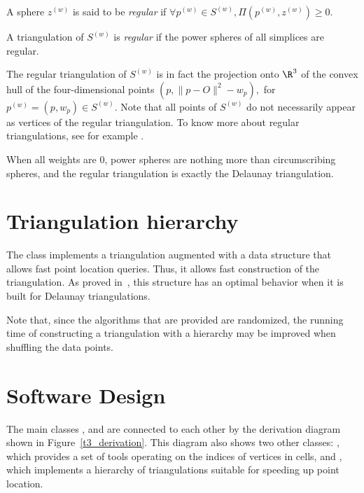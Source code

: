 A sphere ${z}^{(w)}$ is said to be
\textit{regular} if $\forall {p}^{(w)}\in{S}^{(w)},
\Pi{({p}^{(w)},{z}^{(w)})}\geq 0$.

A triangulation of ${S}^{(w)}$ is \textit{regular} if the power spheres
of all simplices are regular. 

The regular triangulation of
${S}^{(w)}$ is in fact the projection onto $\R^3$ of the convex hull 
of the four-dimensional points $(p,\|p-O\|^2-w_p),$ for
${p}^{(w)}=(p,w_p)\in{S}^{(w)}$. 
Note that all points of ${S}^{(w)}$ do not
necessarily appear as vertices of the regular
triangulation. To know more about regular triangulations, see for
example \cite{es-itfwr-96}. 

When all weights are 0, power spheres are nothing more than
circumscribing spheres, and the regular triangulation is exactly the
Delaunay triangulation.

\section{Triangulation hierarchy} 

The class  implements a
triangulation augmented with a data structure that allows fast point
location queries. Thus, it allows fast construction of the
triangulation. As proved in~\cite{cgal:d-dh-02}, this structure has an
optimal behavior when it is built for Delaunay triangulations.

Note that, since the algorithms that are provided are randomized, the
running time of constructing a triangulation with a hierarchy may be
improved when shuffling the data points.

\section{Software Design}
\label{Triangulation3-sec-design}

The main classes ,  and
 are connected to each other by the
derivation diagram shown in Figure~\ref{t3_derivation}.  This diagram
also shows two other classes: , which provides
a set of tools operating on the indices of vertices in cells,
and , which implements a hierarchy of
triangulations suitable for speeding up point location.

